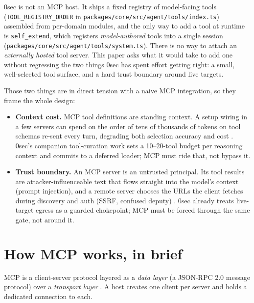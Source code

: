 \documentclass[11pt]{article}
\begin{document}
0sec is not an MCP host. It ships a fixed registry of model-facing tools
(\texttt{TOOL\_REGISTRY\_ORDER} in
\texttt{packages/core/src/agent/tools/index.ts}) assembled from per-domain
modules, and the only way to add a tool at runtime is \texttt{self\_extend},
which registers \emph{model-authored} tools into a single session
(\texttt{packages/core/src/agent/tools/system.ts}). There is no way to attach an
\emph{externally hosted} tool server. This paper asks what it would take to add
one without regressing the two things 0sec has spent effort getting right: a
small, well-selected tool surface, and a hard trust boundary around live
targets.

Those two things are in direct tension with a naive MCP integration, so they
frame the whole design:

\begin{itemize}[leftmargin=*]
  \item \textbf{Context cost.} MCP tool definitions are standing context. A
  setup wiring in a few servers can spend on the order of tens of thousands of
  tokens on tool schemas re-sent every turn, degrading both selection accuracy
  and cost \cite{mcp-clientbp,anthropic-toolsearch}. 0sec's companion
  tool-curation work \cite{tool-curation} sets a 10--20-tool budget per
  reasoning context and commits to a deferred loader; MCP must ride that, not
  bypass it.
  \item \textbf{Trust boundary.} An MCP server is an untrusted principal. Its
  tool results are attacker-influenceable text that flows straight into the
  model's context (prompt injection), and a remote server chooses the URLs the
  client fetches during discovery and auth (SSRF, confused deputy)
  \cite{mcp-security}. 0sec already treats live-target egress as a guarded
  chokepoint; MCP must be forced through the same gate, not around it.
\end{itemize}

\section{How MCP works, in brief}

MCP is a client-server protocol layered as a \emph{data layer} (a JSON-RPC 2.0
message protocol) over a \emph{transport layer} \cite{mcp-arch}. A host creates
one client per server and holds a dedicated connection to each.
\end{document}
